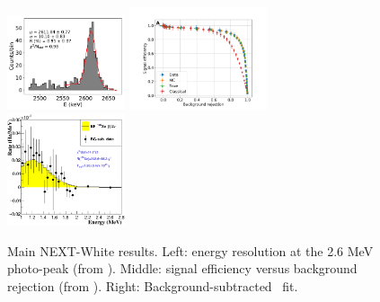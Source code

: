 \begin{figure}
  \begin{center}
    \includegraphics[width=0.31\textwidth]{img/eres_tl208.pdf}
    \includegraphics[width=0.36\textwidth]{img/SigEffBGRej.png}
    \includegraphics[width=0.31\textwidth]{img/BGSubFit.eps}
    \caption{Main NEXT-White results. Left: energy resolution at the 2.6 MeV  photo-peak (from \cite{Renner:2019pfe}). Middle: signal efficiency versus background rejection (from \cite{NEXT:2021pjq}). Right: Background-subtracted \bbtnu ~fit.} 
    \label{fig:newresults}
  \end{center}
\end{figure}


